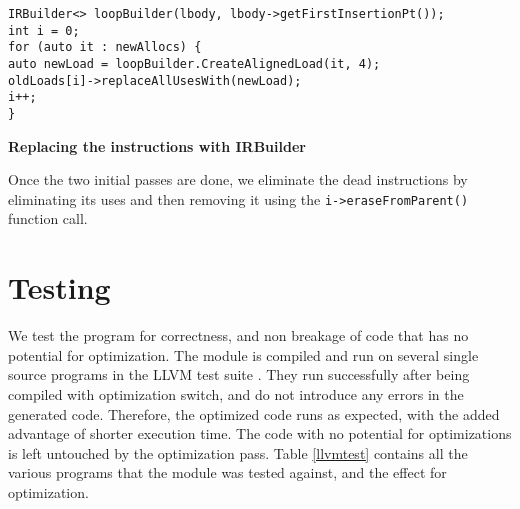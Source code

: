 \begin{lstlisting}
IRBuilder<> loopBuilder(lbody, lbody->getFirstInsertionPt());
int i = 0;
for (auto it : newAllocs) {
auto newLoad = loopBuilder.CreateAlignedLoad(it, 4);
oldLoads[i]->replaceAllUsesWith(newLoad);
i++;
}

\end{lstlisting}
\hspace{55pt} \textbf{Replacing the instructions with IRBuilder}

Once the two initial passes are done, we eliminate the dead instructions by eliminating its uses and then removing it using the \texttt{i->eraseFromParent()} function call.

\section{Testing}
We test the program for correctness, and non breakage of code that has no potential for optimization. The module is compiled and run on several single source programs in the LLVM test suite \cite{llvmtest}. They run successfully after being compiled with optimization switch, and do not introduce any errors in the generated code. Therefore, the optimized code runs as expected, with the added advantage of shorter execution time. The code with no potential for optimizations is left untouched by the optimization pass. Table \ref{llvmtest} contains all the various programs that the module was tested against, and the effect for optimization.


